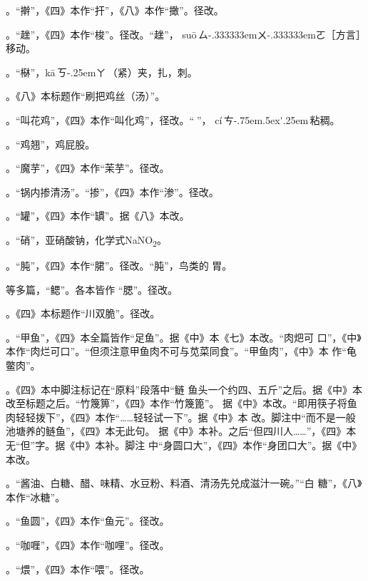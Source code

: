 \begin{list}{}
。“擀”，《四》本作“扞”，《八》本作“撖”。径改。

。“趖”，《四》本作“梭”。径改。“趖”，
{su\={o}}\,{ㄙ\kern-.333333emㄨ\kern-.333333emㄛ}［方言］移动。

。“㮟”，{k\={a}}\,{ㄎ\kern-.25emㄚ}\,（紧）夹，扎，刺。

。《八》本标题作“刷把鸡丝（汤）”。

。“叫花鸡”，《四》本作“叫化鸡”，径改。“𫃕”，%
{c\'{i}}\,{ㄘ\kern-.75em\raise.5ex\hbox{\'{}}\kern.25em}\,粘稠。

。“鸡翘”，鸡屁股。

。“魔芋”，《四》本作“茉芋”。径改。

。“锅内掺清汤”。“掺”，《四》本作“渗”。径改。

。“罐”，《四》本作“罆”。据《八》本改。

。“硝”，亚硝酸钠，化学式NaNO\textsubscript{2}。

。“肫”，《四》本作“𬂁”。径改。“肫”，鸟类的
胃。

等多篇，“鳃”。各本皆作
“腮”。径改。

。《四》本标题作“川双脆”。径改。

。“甲鱼”，《四》本全篇皆作“足鱼”。据《中》本《七》本改。“肉𤆵可
口”，《中》本作“肉烂可口”。“但须注意甲鱼肉不可与苋菜同食”。“甲鱼肉”，《中》本
作“龟鳖肉”。

。《四》本中脚注标记{\footnotesize{}}在“原料”段落中“鲢
鱼头一个约四、五斤”之后。据《中》本改至标题之后。“竹篾箅”，《四》本作“竹篾篦”。
据《中》本改。“即用筷子将鱼肉轻轻拨下”，《四》本作“……轻轻试一下”。据《中》本
改。脚注{\footnotesize{}}中“而不是一般池塘养的鲢鱼”，《四》本无此句。
据《中》本补。之后“但四川人……”，《四》本无“但”字。据《中》本补。脚注
{\footnotesize{}}中“身圆口大”，《四》本作“身团口大”。据《中》本改。

。“酱油、白糖、醋、味精、水豆粉、料酒、清汤先兑成滋汁一碗。”“白
糖”，《八》本作“冰糖”。

。“鱼圆”，《四》本作“鱼元”。径改。

。“咖喱”，《四》本作“咖哩”。径改。

。“煨”，《四》本作“喂”。径改。


\end{list}
